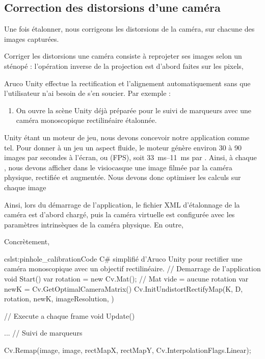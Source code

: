 \subsection{Correction des distorsions d'une caméra}
\label{subsec:pinhole_camera_undistortion}
Une fois étalonner, nous corrigeons les distorsions de la caméra, sur chacune des images capturées.

Corriger les distorsions une caméra consiste à reprojeter ses images selon un sténopé : l'opération inverse de la projection est d'abord faites sur les pixels, 


Aruco Unity effectue la rectification et l'alignement automatiquement sans que l'utilisateur n'ai besoin de s'en soucier. Par exemple :
\begin{enumerate}
  \item On ouvre la scène Unity  déjà préparée pour le suivi de marqueurs avec une caméra monoscopique rectilinéaire étalonnée.
\end{enumerate}

Unity étant un moteur de jeu, nous devons concevoir notre application comme tel. Pour donner à un jeu un aspect fluide, le moteur génère environ 30 à 90 images par secondes à l'écran, ou  (FPS), soit \SIrange{33}{11}{\ms} par . Ainsi, à chaque , nous devons afficher dans le visiocasque une image filmée par la caméra physique, rectifiée et augmentée. Nous devons donc optimiser les calculs sur chaque image

Ainsi, lors du démarrage de l'application, le fichier XML d'étalonnage de la caméra est d'abord chargé, puis la caméra virtuelle est configurée avec les paramètres intrinsèques de la caméra physique. En outre, 

Concrètement, 

\begin{listingETS}{cs}{lst:pinhole_calibration}{Code C\# simplifié d'Aruco Unity pour rectifier une caméra monoscopique avec un objectif rectilinéaire.}
  // Demarrage de l'application
  void Start()
  {
    var rotation = new Cv.Mat(); // Mat vide = aucune rotation
    var newK = Cv.GetOptimalCameraMatrix()
    Cv.InitUndistortRectifyMap(K, D, rotation, newK, imageResolution, )
  }

  // Execute a chaque frame
  void Update()
  {
    ... // Suivi de marqueurs

    Cv.Remap(image, image, rectMapX, rectMapY, Cv.InterpolationFlags.Linear);
  }
\end{listingETS}


